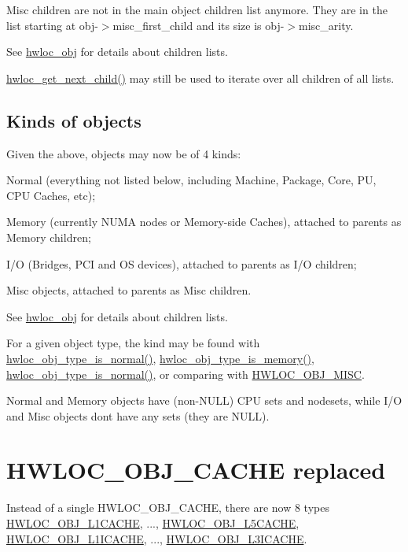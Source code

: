Misc children are not in the main object children list anymore. They are in the list starting at {\ttfamily obj-\/$>$misc\+\_\+first\+\_\+child} and its size is {\ttfamily obj-\/$>$misc\+\_\+arity}.

See \hyperlink{a00238}{hwloc\+\_\+obj} for details about children lists.

\hyperlink{a00197_ga12d8565a3436c565e791ed02a0353621}{hwloc\+\_\+get\+\_\+next\+\_\+child()} may still be used to iterate over all children of all lists.\hypertarget{a00395_upgrade_to_api_2x_kinds_subsec}{}\subsection{Kinds of objects}\label{a00395_upgrade_to_api_2x_kinds_subsec}
Given the above, objects may now be of 4 kinds\+: 
\begin{DoxyItemize}
\item Normal (everything not listed below, including Machine, Package, Core, PU, C\+PU Caches, etc); 
\item Memory (currently N\+U\+MA nodes or Memory-\/side Caches), attached to parents as Memory children; 
\item I/O (Bridges, P\+CI and OS devices), attached to parents as I/O children; 
\item Misc objects, attached to parents as Misc children. 
\end{DoxyItemize}See \hyperlink{a00238}{hwloc\+\_\+obj} for details about children lists.

For a given object type, the kind may be found with \hyperlink{a00198_ga52ef38431eba383b048b98c669b59a16}{hwloc\+\_\+obj\+\_\+type\+\_\+is\+\_\+normal()}, \hyperlink{a00198_ga1d074390c8a3dc3088d84f73fb73f966}{hwloc\+\_\+obj\+\_\+type\+\_\+is\+\_\+memory()}, \hyperlink{a00198_ga52ef38431eba383b048b98c669b59a16}{hwloc\+\_\+obj\+\_\+type\+\_\+is\+\_\+normal()}, or comparing with \hyperlink{a00184_ggacd37bb612667dc437d66bfb175a8dc55a19f8a6953fa91efc76bcbcdf2d22de4d}{H\+W\+L\+O\+C\+\_\+\+O\+B\+J\+\_\+\+M\+I\+SC}.

Normal and Memory objects have (non-\/\+N\+U\+LL) C\+PU sets and nodesets, while I/O and Misc objects don\textquotesingle{}t have any sets (they are N\+U\+LL).

 \hypertarget{a00395_upgrade_to_api_2x_cache}{}\section{H\+W\+L\+O\+C\+\_\+\+O\+B\+J\+\_\+\+C\+A\+C\+H\+E replaced}\label{a00395_upgrade_to_api_2x_cache}
Instead of a single H\+W\+L\+O\+C\+\_\+\+O\+B\+J\+\_\+\+C\+A\+C\+HE, there are now 8 types \hyperlink{a00184_ggacd37bb612667dc437d66bfb175a8dc55a56389b8eb2e2f74f288bb657c4e72140}{H\+W\+L\+O\+C\+\_\+\+O\+B\+J\+\_\+\+L1\+C\+A\+C\+HE}, ..., \hyperlink{a00184_ggacd37bb612667dc437d66bfb175a8dc55a67194c9de5e3e581c64c11d2eb1c109d}{H\+W\+L\+O\+C\+\_\+\+O\+B\+J\+\_\+\+L5\+C\+A\+C\+HE}, \hyperlink{a00184_ggacd37bb612667dc437d66bfb175a8dc55afa834a85d9e53836cf0db6d0bd8329b4}{H\+W\+L\+O\+C\+\_\+\+O\+B\+J\+\_\+\+L1\+I\+C\+A\+C\+HE}, ..., \hyperlink{a00184_ggacd37bb612667dc437d66bfb175a8dc55ac22850c717f07bf7ffb316fadd08d218}{H\+W\+L\+O\+C\+\_\+\+O\+B\+J\+\_\+\+L3\+I\+C\+A\+C\+HE}.


